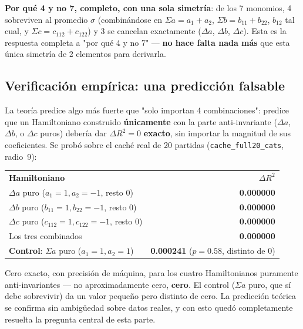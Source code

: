 \documentclass[11pt, a4paper]{article}
\newcommand{\TH}[1]{\cellcolor{cTHbg}\color{white}\textbf{#1}}
\newcommand{\good}[1]{\color{cGood}\textbf{#1}}
\newcommand{\bad}[1]{\color{cBad}\textbf{#1}}
\begin{document}
\begin{tcolorbox}[quotebox]
  \textbf{Por qu\'e 4 y no 7, completo, con una sola simetr\'ia}: de
  los 7 monomios, 4 sobreviven al promedio $\sigma$ (combin\'andose en
  $\Sigma a=a_1{+}a_2$, $\Sigma b=b_{11}{+}b_{22}$, $b_{12}$ tal cual,
  y $\Sigma c=c_{112}{+}c_{122}$) y 3 se cancelan exactamente
  ($\Delta a$, $\Delta b$, $\Delta c$). Esta es la respuesta completa a
  "por qu\'e 4 y no 7" --- \textbf{no hace falta nada m\'as} que esta
  \'unica simetr\'ia de 2 elementos para derivarla.
\end{tcolorbox}

\subsection{Verificaci\'on emp\'irica: una predicci\'on falsable}

La teor\'ia predice algo m\'as fuerte que "solo importan 4
combinaciones": predice que un Hamiltoniano construido
\textbf{\'unicamente} con la parte anti-invariante ($\Delta a$,
$\Delta b$, o $\Delta c$ puros) deber\'ia dar $\Delta R^2=0$
\textbf{exacto}, sin importar la magnitud de sus coeficientes. Se
prob\'o sobre el cach\'e real de 20 partidas
(\texttt{cache\_full20\_cats}, radio~9):

\medskip
\begin{center}
\begin{tabular}{lr}
  \TH{Hamiltoniano} & \TH{$\Delta R^2$} \\[1pt]
  $\Delta a$ puro ($a_1{=}1,a_2{=}{-}1$, resto 0)         & \bad{0.000000} \\
  $\Delta b$ puro ($b_{11}{=}1,b_{22}{=}{-}1$, resto 0)   & \bad{0.000000} \\
  $\Delta c$ puro ($c_{112}{=}1,c_{122}{=}{-}1$, resto 0) & \bad{0.000000} \\
  Los tres combinados                                      & \bad{0.000000} \\
  \good{Control}: $\Sigma a$ puro ($a_1{=}1,a_2{=}1$)      & \good{0.000241} ($p=0.58$, distinto de 0) \\
\end{tabular}
\end{center}
\medskip

\begin{tcolorbox}[quotebox]
  Cero exacto, con precisi\'on de m\'aquina, para los cuatro
  Hamiltonianos puramente anti-invariantes --- no aproximadamente
  cero, \textbf{cero}. El control ($\Sigma a$ puro, que s\'i debe
  sobrevivir) da un valor peque\~no pero distinto de cero. La
  predicci\'on te\'orica se confirma sin ambig\"uedad sobre datos
  reales, y con esto qued\'o completamente resuelta la pregunta
  central de esta parte.
\end{tcolorbox}
\end{document}

